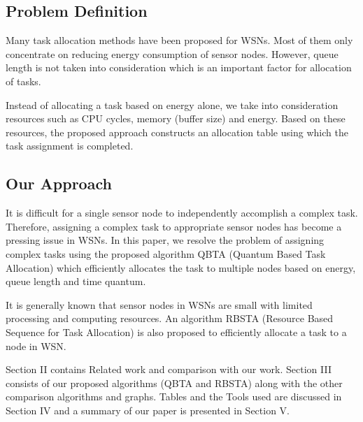 \documentclass[conference]{IEEEtran}
\begin{document}
\subsection{Problem Definition}
\par Many task allocation methods have been proposed for WSNs. Most of them only concentrate on reducing energy consumption of sensor nodes.  However, queue length is not taken into consideration which is an important factor for allocation of tasks.
\par Instead of allocating a task based on energy alone, we take into consideration resources such as CPU cycles, memory (buffer size) and energy. Based on these resources, the proposed approach constructs an allocation table using which the task assignment is completed.
\subsection{Our Approach}
\par It is difficult for a single sensor node to independently accomplish a complex task. Therefore, assigning a complex task to appropriate sensor nodes has become a pressing issue in WSNs. In this paper, we resolve the problem of assigning complex tasks using the proposed algorithm QBTA (Quantum Based Task Allocation) which efficiently allocates the task to multiple nodes based on energy, queue length and time quantum.


\par It is generally known that sensor nodes in WSNs are small with limited processing and computing resources. An algorithm RBSTA (Resource Based Sequence for Task Allocation) is also proposed to efficiently allocate a task to a node in WSN.  

\par  Section II contains Related work and comparison with our work. Section III consists of our proposed algorithms (QBTA and RBSTA) along with the other comparison algorithms and graphs. Tables and the Tools used are discussed in Section IV and a summary of our paper is presented in Section V.
\end{document}
